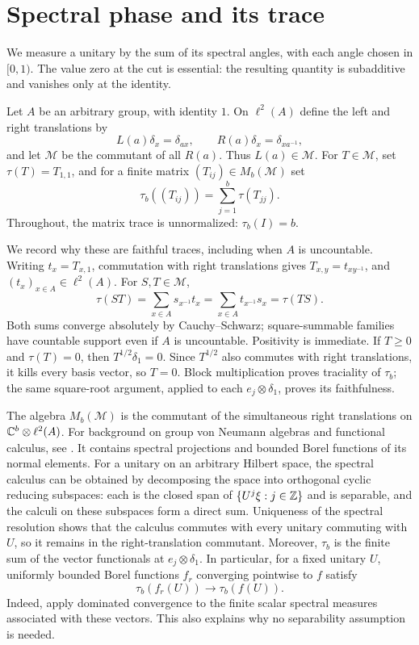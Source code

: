 \section{Spectral phase and its trace}\label{sec:phase}

We measure a unitary by the sum of its spectral angles, with each angle
chosen in $[0,1)$.  The value zero at the cut is essential: the resulting
quantity is subadditive and vanishes only at the identity.

Let $A$ be an arbitrary group, with identity $1$.  On $\ell^2(A)$ define
the left and right translations by
\[
 L(a)\delta_x=\delta_{ax},\qquad R(a)\delta_x=\delta_{xa^{-1}},
\]
and let $\mathcal M$ be the commutant of all $R(a)$.  Thus $L(a)\in\mathcal M$.
For $T\in\mathcal M$, set $\tau(T)=T_{1,1}$, and for a finite matrix
$(T_{ij})\in M_b(\mathcal M)$ set
\[
 \tau_b((T_{ij}))=\sum_{j=1}^b\tau(T_{jj}).
\]
Throughout, the matrix trace is unnormalized: $\tau_b(I)=b$.

We record why these are faithful traces, including when $A$ is uncountable.
Writing $t_x=T_{x,1}$, commutation with right translations gives
$T_{x,y}=t_{xy^{-1}}$, and $(t_x)_{x\in A}\in\ell^2(A)$.
For $S,T\in\mathcal M$,
\[
 \tau(ST)=\sum_{x\in A}s_{x^{-1}}t_x
 =\sum_{x\in A}t_{x^{-1}}s_x=\tau(TS).
\]
Both sums converge absolutely by Cauchy--Schwarz; square-summable
families have countable support even if $A$ is uncountable.  Positivity
is immediate.  If $T\geq0$ and $\tau(T)=0$, then
$T^{1/2}\delta_1=0$.  Since $T^{1/2}$ also commutes with right
translations, it kills every basis vector, so $T=0$.
Block multiplication proves traciality of $\tau_b$; the same square-root
argument, applied to each $e_j\otimes\delta_1$, proves its faithfulness.

The algebra $M_b(\mathcal M)$ is the commutant of the simultaneous right
translations on $\mathbb C^b\otimes\ell^2(A)$.  For background on group von Neumann algebras and functional calculus, see
\cite[Sections 2.2, 3.3, and 3.4, EP1]{Jones2009}. It contains spectral
projections and bounded Borel functions of its normal elements.
For a unitary on an arbitrary Hilbert space, the spectral calculus can
be obtained by decomposing the space into orthogonal cyclic reducing
subspaces: each is the closed span of $\{U^j\xi:j\in\mathbb Z\}$ and is
separable, and the calculi on these subspaces form a direct sum.
Uniqueness of the spectral resolution shows that the calculus commutes
with every unitary commuting with $U$, so it remains in the
right-translation commutant.
Moreover, $\tau_b$ is the finite sum of the vector functionals at
$e_j\otimes\delta_1$.  In particular, for a fixed unitary $U$, uniformly
bounded Borel functions $f_r$ converging pointwise to $f$ satisfy
\begin{equation}\label{eq:phase-bounded-convergence}
 \tau_b(f_r(U))\longrightarrow\tau_b(f(U)).
\end{equation}
Indeed, apply dominated convergence to the finite scalar spectral
measures associated with these vectors.  This also explains why no
separability assumption is needed.

